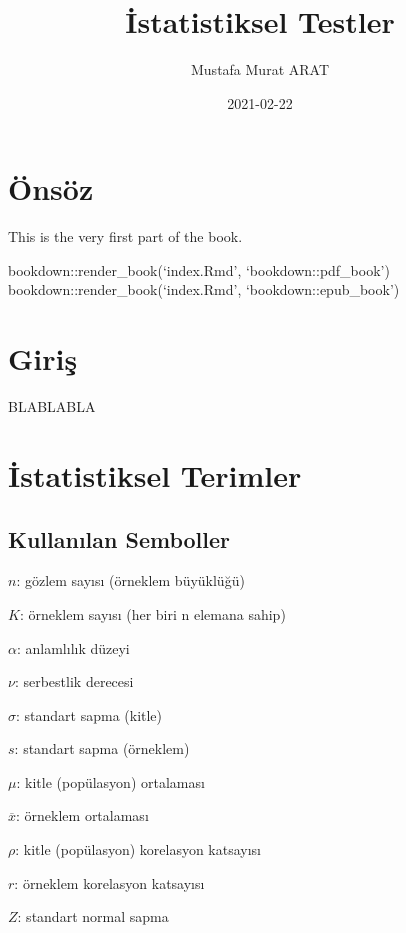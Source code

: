 \documentclass[
  12pt,
]{book}
\title{İstatistiksel Testler}
\author{Mustafa Murat ARAT}
\date{2021-02-22}
\begin{document}
\maketitle

{
\setcounter{tocdepth}{3}
\tableofcontents
}
\hypertarget{uxf6nsuxf6z}{%
\chapter*{Önsöz}\label{uxf6nsuxf6z}}

This is the very first part of the book.

bookdown::render\_book(`index.Rmd', `bookdown::pdf\_book')
bookdown::render\_book(`index.Rmd', `bookdown::epub\_book')

\hypertarget{introduction}{%
\chapter{Giriş}\label{introduction}}

BLABLABLA

\hypertarget{statisticalterms}{%
\chapter{İstatistiksel Terimler}\label{statisticalterms}}

\hypertarget{kullanux131lan-semboller}{%
\section{Kullanılan Semboller}\label{kullanux131lan-semboller}}

\(n\): gözlem sayısı (örneklem büyüklüğü)

\(K\): örneklem sayısı (her biri n elemana sahip)

\(\alpha\): anlamlılık düzeyi

\(\nu\): serbestlik derecesi

\(\sigma\): standart sapma (kitle)

\(s\): standart sapma (örneklem)

\(\mu\): kitle (popülasyon) ortalaması

\(\overline{x}\): örneklem ortalaması

\(\rho\): kitle (popülasyon) korelasyon katsayısı

\(r\): örneklem korelasyon katsayısı

\(Z\): standart normal sapma
\end{document}
